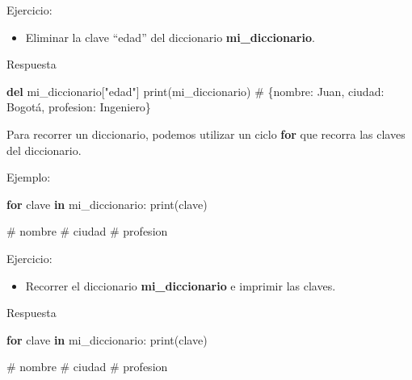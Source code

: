 \documentclass[
  a4paper,
  DIV=11,
  numbers=noendperiod,
  onepage,
  openany]{scrreprt}
\newenvironment{Shaded}{\begin{snugshade}}{\end{snugshade}}
\newcommand{\BuiltInTok}[1]{\textcolor[rgb]{0.00,0.23,0.31}{#1}}
\newcommand{\CommentTok}[1]{\textcolor[rgb]{0.37,0.37,0.37}{#1}}
\newcommand{\ControlFlowTok}[1]{\textcolor[rgb]{0.00,0.23,0.31}{\textbf{#1}}}
\newcommand{\KeywordTok}[1]{\textcolor[rgb]{0.00,0.23,0.31}{\textbf{#1}}}
\newcommand{\NormalTok}[1]{\textcolor[rgb]{0.00,0.23,0.31}{#1}}
\newcommand{\StringTok}[1]{\textcolor[rgb]{0.13,0.47,0.30}{#1}}
\providecommand{\tightlist}{%
  \setlength{\itemsep}{0pt}\setlength{\parskip}{0pt}}\usepackage{longtable,booktabs,array}
\begin{document}
Ejercicio:

\begin{itemize}
\tightlist
\item
  Eliminar la clave ``edad'' del diccionario \textbf{mi\_diccionario}.
\end{itemize}

Respuesta

\begin{Shaded}
\begin{Highlighting}[]
\KeywordTok{del}\NormalTok{ mi\_diccionario[}\StringTok{"edad"}\NormalTok{]}
\BuiltInTok{print}\NormalTok{(mi\_diccionario)  }\CommentTok{\# \{\textquotesingle{}nombre\textquotesingle{}: \textquotesingle{}Juan\textquotesingle{}, \textquotesingle{}ciudad\textquotesingle{}: \textquotesingle{}Bogotá\textquotesingle{}, \textquotesingle{}profesion\textquotesingle{}: \textquotesingle{}Ingeniero\textquotesingle{}\}}
\end{Highlighting}
\end{Shaded}

Para recorrer un diccionario, podemos utilizar un ciclo \textbf{for} que
recorra las claves del diccionario.

Ejemplo:

\begin{Shaded}
\begin{Highlighting}[]
\ControlFlowTok{for}\NormalTok{ clave }\KeywordTok{in}\NormalTok{ mi\_diccionario:}
    \BuiltInTok{print}\NormalTok{(clave)}

\CommentTok{\# nombre}
\CommentTok{\# ciudad}
\CommentTok{\# profesion}
\end{Highlighting}
\end{Shaded}

Ejercicio:

\begin{itemize}
\tightlist
\item
  Recorrer el diccionario \textbf{mi\_diccionario} e imprimir las
  claves.
\end{itemize}

Respuesta

\begin{Shaded}
\begin{Highlighting}[]
\ControlFlowTok{for}\NormalTok{ clave }\KeywordTok{in}\NormalTok{ mi\_diccionario:}
    \BuiltInTok{print}\NormalTok{(clave)}

\CommentTok{\# nombre}
\CommentTok{\# ciudad}
\CommentTok{\# profesion}
\end{Highlighting}
\end{Shaded}
\end{document}
